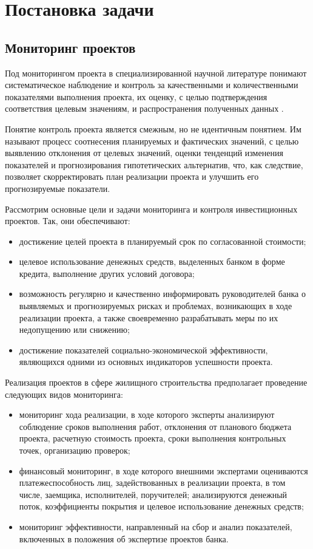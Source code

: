 \documentclass[12pt,a4paper]{article} %
\begin{document}
\newpage
\section{Постановка задачи}


\subsection{Мониторинг проектов}\label{task}

Под мониторингом проекта в специализированной научной литературе понимают систематическое наблюдение и контроль за качественными и количественными показателями выполнения проекта, их оценку, с целью подтверждения соответствия целевым значениям, и распространения полученных данных \cite{Nikon}.

Понятие контроль проекта является смежным, но не идентичным понятием. Им называют процесс соотнесения планируемых и фактических значений, с целью выявлению отклонения от целевых значений, оценки тенденций изменения показателей и прогнозирования гипотетических альтернатив, что, как следствие, позволяет скорректировать план реализации проекта и улучшить его прогнозируемые показатели.

Рассмотрим основные цели и задачи мониторинга и контроля инвестиционных проектов. Так, они обеспечивают:

\begin{itemize}
	\item достижение целей проекта в планируемый срок по согласованной стоимости;
	\item целевое использование денежных средств, выделенных банком в форме кредита, выполнение других условий договора;
	\item возможность регулярно и качественно информировать руководителей банка о выявляемых и прогнозируемых рисках и проблемах, возникающих в ходе реализации проекта, а также своевременно разрабатывать меры по их недопущению или снижению;
	\item достижение показателей социально-экономической эффективности, являющихся одними из основных индикаторов успешности проекта.
\end{itemize}

Реализация проектов в сфере жилищного строительства предполагает проведение следующих видов мониторинга\cite{Nikon}:
\begin{itemize}
	\item мониторинг хода реализации, в ходе которого эксперты анализируют соблюдение сроков выполнения работ, отклонения от планового бюджета проекта, расчетную стоимость проекта, сроки выполнения контрольных точек, организацию проверок;
	\item финансовый мониторинг, в ходе которого внешними экспертами оцениваются платежеспособность лиц, задействованных в реализации проекта, в том числе, заемщика, исполнителей, поручителей; анализируются денежный поток, коэффициенты покрытия и целевое использование денежных средств;
	\item мониторинг эффективности, направленный на сбор и анализ показателей, включенных в положения об экспертизе проектов банка.
\end{itemize}
\end{document}
